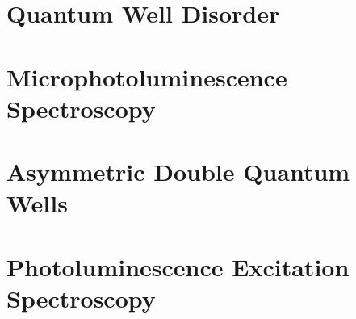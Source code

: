 \section{Quantum Well Disorder}






\section{Microphotoluminescence Spectroscopy}

\section{Asymmetric Double Quantum Wells}
\section{Photoluminescence Excitation Spectroscopy}